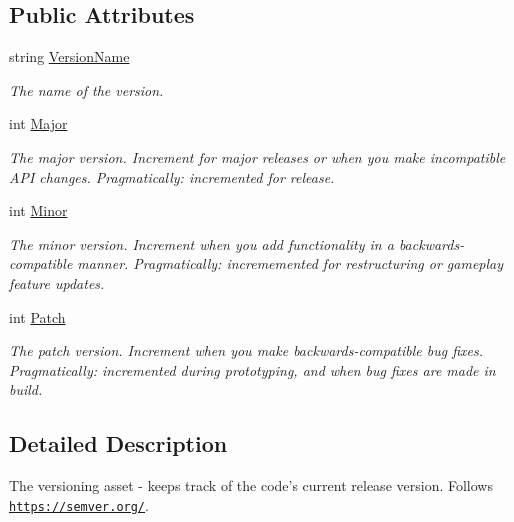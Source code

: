 \subsection*{Public Attributes}
\begin{DoxyCompactItemize}
\item 
string \hyperlink{class_version_a55ae9ac9a38915b9bc0cfab9953e9c21}{Version\-Name}
\begin{DoxyCompactList}\small\item\em The name of the version. \end{DoxyCompactList}\item 
int \hyperlink{class_version_aeaf20290509249554961b91b5f0eb75f}{Major}
\begin{DoxyCompactList}\small\item\em The major version. Increment for major releases or when you make incompatible A\-P\-I changes. Pragmatically\-: incremented for release. \end{DoxyCompactList}\item 
int \hyperlink{class_version_a888691997b924984ba335e26e4027a0d}{Minor}
\begin{DoxyCompactList}\small\item\em The minor version. Increment when you add functionality in a backwards-\/compatible manner. Pragmatically\-: incrememented for restructuring or gameplay feature updates. \end{DoxyCompactList}\item 
int \hyperlink{class_version_a4ec3e76901e7c0d080b3113d24e3a5aa}{Patch}
\begin{DoxyCompactList}\small\item\em The patch version. Increment when you make backwards-\/compatible bug fixes. Pragmatically\-: incremented during prototyping, and when bug fixes are made in build. \end{DoxyCompactList}\end{DoxyCompactItemize}


\subsection{Detailed Description}
The versioning asset -\/ keeps track of the code's current release version. Follows \href{https://semver.org/}{\tt https\-://semver.\-org/}. 



